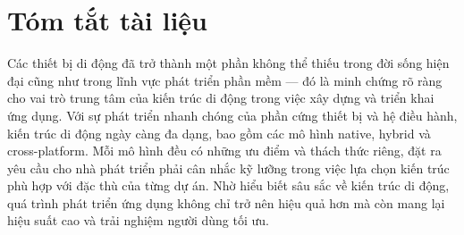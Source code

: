 \chapter*{Tóm tắt tài liệu}

Các thiết bị di động đã trở thành một phần không thể thiếu trong đời sống hiện đại cũng như trong lĩnh vực phát triển phần mềm — đó là minh chứng rõ ràng cho vai trò trung tâm của kiến trúc di động trong việc xây dựng và triển khai ứng dụng. Với sự phát triển nhanh chóng của phần cứng thiết bị và hệ điều hành, kiến trúc di động ngày càng đa dạng, bao gồm các mô hình native, hybrid và cross-platform. Mỗi mô hình đều có những ưu điểm và thách thức riêng, đặt ra yêu cầu cho nhà phát triển phải cân nhắc kỹ lưỡng trong việc lựa chọn kiến trúc phù hợp với đặc thù của từng dự án. Nhờ hiểu biết sâu sắc về kiến trúc di động, quá trình phát triển ứng dụng không chỉ trở nên hiệu quả hơn mà còn mang lại hiệu suất cao và trải nghiệm người dùng tối ưu.
